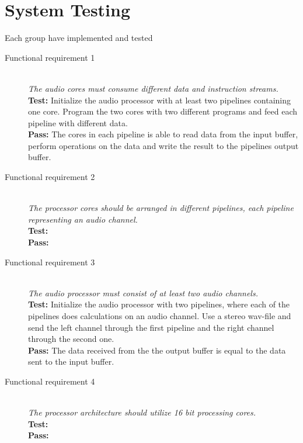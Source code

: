 \section{System Testing}
Each group have implemented and tested 

\begin{description}
    \item[Functional requirement 1] \hfill \\
        \textit{The audio cores must consume different data and instruction streams. } \\
        \textbf{Test:} Initialize the audio processor with at least two pipelines
        containing one core. Program the two cores with two different programs and feed
        each pipeline with different data.\\
        \textbf{Pass:} The cores in each pipeline is able to read data from the input buffer,
        perform operations on the data and write the result to the pipelines output buffer.\\
    \item[Functional requirement 2] \hfill \\
        \textit{The processor cores should be arranged in different pipelines,
        each pipeline representing an audio channel.} \\
        \textbf{Test:} \\
        \textbf{Pass:} \\
    \item[Functional requirement 3] \hfill \\
        \textit{The audio processor must consist of at least two audio channels. } \\
        \textbf{Test:} Initialize the audio processor with two pipelines, where each of the 
        pipelines does calculations on an audio channel. Use a stereo wav-file and send
        the left channel through the first pipeline and the right channel through the
        second one. \\
        \textbf{Pass:} The data received from the the output buffer is equal to the
        data sent to the input buffer. \\
    \item[Functional requirement 4] \hfill \\
        \textit{The processor architecture should utilize 16 bit processing cores. } \\
        \textbf{Test:} \\
        \textbf{Pass:} \\

\end{description}
